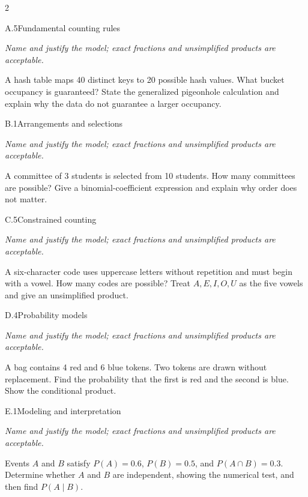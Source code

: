 \documentclass[9pt]{extarticle}
\begin{document}
\CoreWorkArea
\FormBreak
{}
\begin{multicols}{2}
\begin{CoreProblem}{A.5}{Fundamental counting rules}
{\scriptsize\textit{Name and justify the model; exact fractions and unsimplified products are acceptable.}\par}
A hash table maps 40 distinct keys to 20 possible hash values. What
    bucket occupancy is guaranteed? State the generalized pigeonhole calculation
    and explain why the data do not guarantee a larger occupancy.
\end{CoreProblem}
\begin{CoreProblem}{B.1}{Arrangements and selections}
{\scriptsize\textit{Name and justify the model; exact fractions and unsimplified products are acceptable.}\par}
A committee of 3 students is selected from 10 students. How many
    committees are possible? Give a binomial-coefficient expression and explain
    why order does not matter.
\end{CoreProblem}
\begin{CoreProblem}{C.5}{Constrained counting}
{\scriptsize\textit{Name and justify the model; exact fractions and unsimplified products are acceptable.}\par}
A six-character code uses uppercase letters without repetition and
    must begin with a vowel. How many codes are possible? Treat
    $A,E,I,O,U$ as the five vowels and give an unsimplified product.
\end{CoreProblem}
\columnbreak
\begin{CoreProblem}{D.4}{Probability models}
{\scriptsize\textit{Name and justify the model; exact fractions and unsimplified products are acceptable.}\par}
A bag contains 4 red and 6 blue tokens. Two tokens are drawn without
    replacement. Find the probability that the first is red and the second is
    blue. Show the conditional product.
\end{CoreProblem}
\begin{CoreProblem}{E.1}{Modeling and interpretation}
{\scriptsize\textit{Name and justify the model; exact fractions and unsimplified products are acceptable.}\par}
Events $A$ and $B$ satisfy $P(A)=0.6$, $P(B)=0.5$, and
    $P(A\cap B)=0.3$. Determine whether $A$ and $B$ are independent, showing
    the numerical test, and then find $P(A\mid B)$.
\end{CoreProblem}
\end{multicols}
\end{document}
